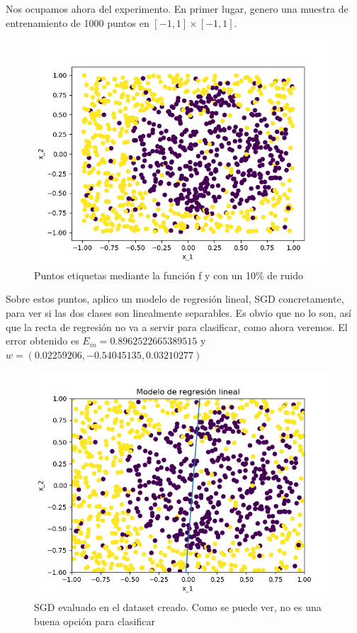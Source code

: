 Nos ocupamos ahora del experimento. En primer lugar, genero una muestra de entrenamiento de 1000 puntos en $[-1,1]\times[-1,1]$.
\begin{figure}[H] %
	\centering
	\includegraphics[scale=0.6]{puntos2.png}  %
	\caption{Puntos etiquetas mediante la función f y con un 10\% de ruido} 
	\label{fig:puntos2D-et}
\end{figure}
 
Sobre estos puntos, aplico un modelo de regresión lineal, SGD concretamente, para ver si las dos clases son linealmente separables. Es obvio que no lo son, así que la recta de regresión no va a servir para clasificar, como ahora veremos. El error obtenido es $E_{in} = 0.8962522665389515$ y $w=(0.02259206,-0.54045135,0.03210277)$

\begin{figure}[H] %
	\centering
	\includegraphics[scale=0.6]{sgd-puntos.png}  %
	\caption{SGD evaluado en el dataset creado. Como se puede ver, no es una buena opción para clasificar} 
	\label{fig:sgd-p}
\end{figure}

